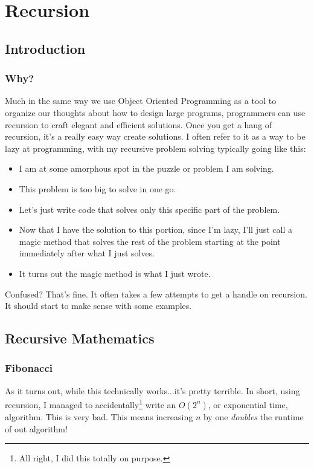 \chapter{Recursion}

\section{Introduction}

\subsection{Why?}

Much in the same way we use Object Oriented Programming as a tool to organize our thoughts about how to design large programs, programmers can use recursion to craft elegant and efficient solutions. Once you get a hang of recursion, it's a really easy way create solutions.  I often refer to it as a way to be lazy at programming, with my recursive problem solving typically going like this:

\begin{itemize}
	\item I am at some amorphous spot in the puzzle or problem I am solving. 
	\item This problem is too big to solve in one go.
	\item Let's just write code that solves only this specific part of the problem.
	\item Now that I have the solution to this portion, since I'm lazy, I'll just call a magic method that solves the rest of the problem starting at the point immediately  after what  I just solves.
	\item It turns out the magic method is what I just wrote.
\end{itemize}


Confused?  That's fine.  It often takes a few attempts to get a handle on recursion.  It should start to make sense with some examples.
\section{Recursive Mathematics}


\subsection{Fibonacci}
As it turns out, while this technically works...it's pretty terrible.  In short, using recursion, I managed to accidentally\footnote{All right, I did this totally on purpose.} write an $ O(2^n) $, or exponential time,  algorithm.  This is very bad.  This means increasing $ n $ by one \emph{doubles} the runtime of out algorithm!


